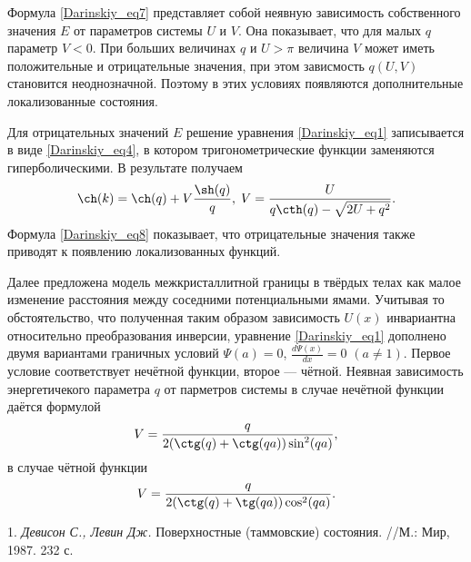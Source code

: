 Формула \eqref{Darinskiy_eq7}  представляет собой неявную зависимость собственного значения $E$ от параметров
системы $U$ и $V$. Она показывает, что для малых $q$ параметр $V<0$. При больших величинах $q$ и $U>\pi$ величина $V$
может иметь положительные и отрицательные значения, при этом зависмость $q(U,V)$ становится
неоднозначной. Поэтому в этих условиях появляются  дополнительные локализованные состояния.
\par Для отрицательных значений $E$ решение уравнения \eqref{Darinskiy_eq1} записывается в виде \eqref{Darinskiy_eq4}, в котором тригонометрические функции заменяются гиперболическими.
В результате получаем
\begin{multline} \label{Darinskiy_eq8}
\ch(k)=\ch(q)+V\frac{\sh(q)}{q},\;V=\frac{U}{q\cth(q)-\sqrt{2U+q^2}}.
\end{multline}
Формула \eqref{Darinskiy_eq8} показывает, что отрицательные значения также приводят к появлению локализованных функций.
\par Далее предложена модель межкристаллитной границы в твёрдых телах как малое изменение расстояния между соседними потенциальными ямами. Учитывая то обстоятельство, что полученная таким образом зависимость $U(x)$
инвариантна относительно преобразования инверсии, уравнение \eqref{Darinskiy_eq1} дополнено двумя вариантами граничных условий
$\Psi(a)=0$, $\frac{d\Psi(x)}{dx}=0$ $(a\neq1)$. Первое условие соответствует
нечётной функции, второе — чётной. Неявная зависимость энергетичекого параметра $q$ от парметров системы в случае нечётной функции даётся формулой
\begin{equation*}
V=\frac{q}{2(\ctg(q)+\ctg(qa))\sin^2(qa)},
\end{equation*}
в случае чётной функции
\begin{equation*}
V=\frac{q}{2(\ctg(q)+\tg(qa))\cos^2(qa)}.
\end{equation*}

\litlist

1. {\it Девисон С., Левин Дж.} Поверхностные (таммовские) состояния. //М.: Мир, 1987. 232 с.
